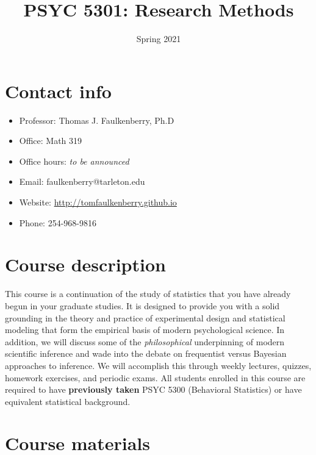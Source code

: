 \documentclass[10pt]{article}
\date{Spring 2021}
\title{PSYC 5301: Research Methods}
\begin{document}
\maketitle

\section*{Contact info}
\label{sec:org086724c}
\begin{itemize}
\item Professor: Thomas J. Faulkenberry, Ph.D
\item Office: Math 319
\item Office hours: \emph{to be announced}
\item Email: faulkenberry@tarleton.edu
\item Website: \url{http://tomfaulkenberry.github.io}
\item Phone: 254-968-9816
\end{itemize}

\section*{Course description}
\label{sec:org280d5ea}

This course is a continuation of the study of statistics that you have already begun in your graduate studies. It is designed to provide you with a solid grounding in the theory and practice of experimental design and statistical modeling that form the empirical basis of modern psychological science. In addition, we will discuss some of the \emph{philosophical} underpinning of modern scientific inference and wade into the debate on frequentist versus Bayesian approaches to inference.  We will accomplish this through weekly lectures, quizzes, homework exercises, and periodic exams. All students enrolled in this course are required to have \textbf{previously taken} PSYC 5300 (Behavioral Statistics) or have equivalent statistical background.

\section*{Course materials}
\label{sec:org3f0b96b}
\end{document}
